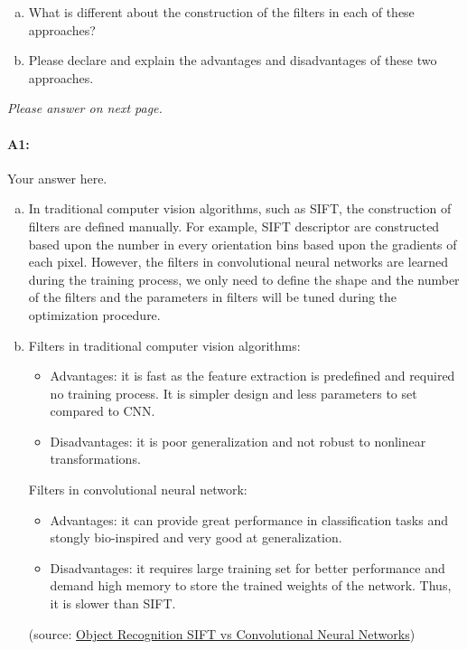 \begin{enumerate} [(a)]
    \item What is different about the construction of the filters in each of these approaches?
    \item Please declare and explain the advantages and disadvantages of these two approaches.
\end{enumerate}
\emph{Please answer on next page.}

\pagebreak
\paragraph{A1:} Your answer here.

\begin{enumerate}[(a)]

    \item In traditional computer vision algorithms, such as SIFT, the construction of filters are defined manually. For example, SIFT descriptor are constructed based upon the number in every orientation bins based upon the gradients of each pixel. However, the filters in convolutional neural networks are learned during the training process, we only need to define the shape and the number of the filters and the parameters in filters will be tuned during the optimization procedure.

    \item Filters in traditional computer vision algorithms:
          \begin{itemize}
              \item Advantages: it is fast as the feature extraction is predefined and required no training process. It is simpler design and less parameters to set compared to CNN.
              \item Disadvantages: it is poor generalization and not robust to nonlinear transformations.
          \end{itemize}
          Filters in convolutional neural network:
          \begin{itemize}
              \item Advantages: it can provide great performance in classification tasks and stongly bio-inspired and very good at generalization.
              \item Disadvantages: it requires large training set for better performance and demand high memory to store the trained weights of the network. Thus, it is slower than SIFT.
          \end{itemize}

          (source: \href{https://tams.informatik.uni-hamburg.de/lectures/2015ws/seminar/ir/pdf/slides/JosipJosifovski-Object_Recognition_SIFT_vs_Convolutional_Neural_Networks.pdf}{Object Recognition SIFT vs Convolutional Neural Networks})
\end{enumerate}


